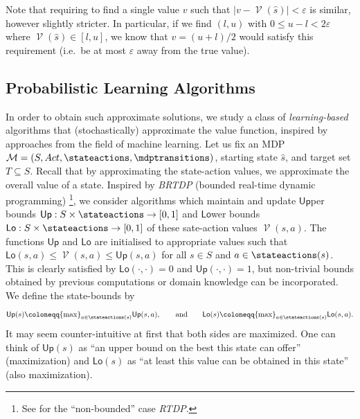 \documentclass{article}
\newcommand{\MDP}{\mathcal{M}}
\newcommand{\States}{S}
\newcommand{\initialstate}{\hat{s}}
\newcommand{\Actions}{Act}
\DeclareMathOperator{\val}{\mathcal{V}}
\newcommand{\upperbound}{\mathsf{Up}}
\newcommand{\lowerbound}{\mathsf{Lo}}
\newcommand{\targetset}{T}
\begin{document}
Note that requiring to find a single value $v$ such that $|v - \val(\initialstate)| < \varepsilon$ is similar, however slightly stricter.
In particular, if we find $(l, u)$ with $0 \leq u - l < 2 \varepsilon$ where $\val(\initialstate) \in [l, u]$, we know that $v = (u + l) / 2$ would satisfy this requirement (i.e.\ be at most $\varepsilon$ away from the true value).

\subsection{Probabilistic Learning Algorithms} \label{sec:preliminaries:learning}
In order to obtain such approximate solutions, we study a class of \emph{learning-based} algorithms that (stochastically) approximate the value function, inspired by approaches from the field of machine learning.
Let us fix an MDP $\MDP = (\States, \Actions, \stateactions, \mdptransitions)$, starting state $\initialstate$, and target set $\targetset \subseteq \States$.
Recall that by approximating the state-action values, we approximate the overall value of a state.
Inspired by \emph{BRTDP} (bounded real-time dynamic programming) \cite{DBLP:conf/icml/McMahanLG05}\footnote{See \cite{DBLP:journals/ai/BartoBS95} for the \enquote{non-bounded} case \emph{RTDP}.}, we consider algorithms which maintain and update $\upperbound$per bounds $\upperbound : \States \times \stateactions \to [0, 1]$ and $\lowerbound$wer bounds $\lowerbound : \States \times \stateactions \to [0, 1]$ of these sate-action values $\val(s, a)$.
The functions $\upperbound$ and $\lowerbound$ are initialised to appropriate values such that $\lowerbound(s, a) \leq \val(s, a) \leq \upperbound(s, a)$ for all $s \in \States$ and $a \in \stateactions(s)$.
This is clearly satisfied by $\lowerbound(\cdot, \cdot) = 0$ and $\upperbound(\cdot, \cdot) = 1$, but non-trivial bounds obtained by previous computations or domain knowledge can be incorporated.
We define the state-bounds by
\begin{equation*}
	\upperbound(s) \coloneqq {\max}_{a \in \stateactions(s)} \upperbound(s, a), \qquad \text{and} \qquad \lowerbound(s) \coloneqq {\max}_{a \in \stateactions(s)} \lowerbound(s, a).
\end{equation*}
It may seem counter-intuitive at first that both sides are maximized.
One can think of $\upperbound(s)$ as \enquote{an upper bound on the best this state can offer} (maximization) and $\lowerbound(s)$ as \enquote{at least this value can be obtained in this state} (also maximization).
\end{document}
